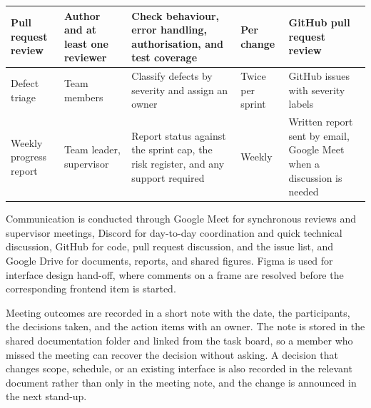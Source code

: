 \begin{table}[H]
\begin{tabular}{|L{3.0cm}|L{2.7cm}|L{3.9cm}|L{2.1cm}|L{2.7cm}|}
Pull request review &
Author and at least one reviewer &
Check behaviour, error handling, authorisation, and test coverage &
Per change &
GitHub pull request review \\
\hline

Defect triage &
Team members &
Classify defects by severity and assign an owner &
Twice per sprint &
GitHub issues with severity labels \\
\hline

Weekly progress report &
Team leader, supervisor &
Report status against the sprint cap, the risk register, and any support required &
Weekly &
Written report sent by email, Google Meet when a discussion is needed \\
\hline

\end{tabular}
\end{table}

Communication is conducted through Google Meet for synchronous reviews and supervisor meetings, Discord for day-to-day coordination and quick technical discussion, GitHub for code, pull request discussion, and the issue list, and Google Drive for documents, reports, and shared figures. Figma is used for interface design hand-off, where comments on a frame are resolved before the corresponding frontend item is started.

Meeting outcomes are recorded in a short note with the date, the participants, the decisions taken, and the action items with an owner. The note is stored in the shared documentation folder and linked from the task board, so a member who missed the meeting can recover the decision without asking. A decision that changes scope, schedule, or an existing interface is also recorded in the relevant document rather than only in the meeting note, and the change is announced in the next stand-up.
